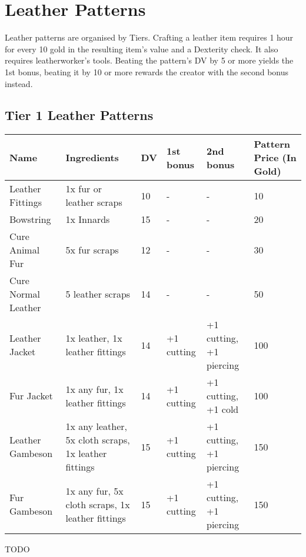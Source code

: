 \section{Leather Patterns}\label{sec:leatherPatterns}
Leather patterns are organised by Tiers.
Crafting a leather item requires 1 hour for every 10 gold in the resulting item's value and a Dexterity check.
It also requires leatherworker's tools.
Beating the pattern's DV by 5 or more yields the 1st bonus, beating it by 10 or more rewards the creator with the second bonus instead.\\

\subsection{Tier 1 Leather Patterns}
\begin{longtable}{p{1.5cm} | p{2.5cm} | l | p{2cm} | p{2cm} | p{1cm} }
	Name & Ingredients & DV  & 1st bonus & 2nd bonus & Pattern Price (In Gold)\\ \hline
	Leather Fittings & 1x fur or leather scraps & 10 & - & - & 10\\
	Bowstring & 1x Innards & 15 & - & - & 20\\
	Cure Animal Fur & 5x fur scraps & 12 & - & - & 30\\
	Cure Normal Leather & 5 leather scraps & 14 & - & - & 50\\
	Leather Jacket & 1x leather, 1x leather fittings & 14 & +1 cutting & +1 cutting, +1 piercing & 100\\
	Fur Jacket & 1x any fur, 1x leather fittings & 14 & +1 cutting & +1 cutting, +1 cold & 100\\
	Leather Gambeson & 1x any leather, 5x cloth scraps, 1x leather fittings & 15 & +1 cutting & +1 cutting, +1 piercing & 150\\
	Fur Gambeson & 1x any fur, 5x cloth scraps, 1x leather fittings & 15 & +1 cutting & +1 cutting, +1 piercing & 150\\
\end{longtable}

TODO

